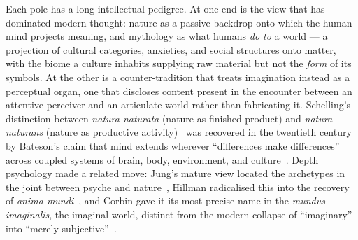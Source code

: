 \documentclass[11pt,a4paper]{article}
\begin{document}
Each pole has a long intellectual pedigree. At one end is the view
that has dominated modern thought: nature as a passive backdrop onto
which the human mind projects meaning, and mythology as what humans
\emph{do to} a world --- a projection of cultural categories,
anxieties, and social structures onto matter, with the biome a culture
inhabits supplying raw material but not the \emph{form} of its symbols.
At the other is a counter-tradition that treats imagination instead as
a perceptual organ, one that discloses content present in the encounter
between an attentive perceiver and an articulate world rather than
fabricating it. Schelling's distinction between \emph{natura naturata}
(nature as finished product) and \emph{natura naturans} (nature as
productive activity)~\citep{schelling1797ideas,schelling1799outline}
was recovered in the twentieth century by Bateson's claim that mind
extends wherever ``differences make differences'' across coupled
systems of brain, body, environment, and
culture~\citep{bateson1972steps,bateson1979mind}. Depth psychology made
a related move: Jung's mature view located the archetypes in the joint
between psyche and nature~\citep{jung1959archetypes}, Hillman
radicalised this into the recovery of \emph{anima
mundi}~\citep{hillman1975revisioning,hillman1981thought}, and Corbin
gave it its most precise name in the \emph{mundus imaginalis}, the
imaginal world, distinct from the modern collapse of ``imaginary'' into
``merely
subjective''~\citep{corbin1972mundus,barfield1957saving,abram1996spell,ingold2000perception}.
\end{document}
